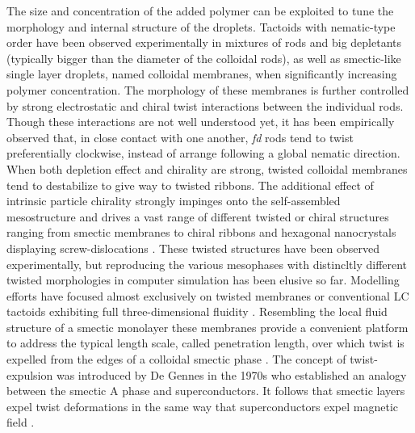  The size and concentration of the added polymer can be exploited to  tune the morphology and internal structure of the droplets. Tactoids with nematic-type order have been observed experimentally in mixtures of rods and big depletants (typically bigger than the diameter of the colloidal rods), as well as smectic-like single layer droplets, named colloidal membranes, when significantly increasing polymer concentration. The morphology of these membranes is further controlled by strong electrostatic and chiral twist interactions between the individual rods. Though these interactions are not well understood yet, it has been empirically observed that, in close contact with one another, {\em fd} rods tend to twist preferentially clockwise, instead of arrange following a global nematic direction. When both depletion effect and chirality are strong, twisted colloidal membranes tend to destabilize to give way to twisted ribbons. The additional effect of intrinsic particle chirality strongly impinges  onto the self-assembled mesostructure and drives a vast range of different twisted or chiral structures ranging from smectic membranes to chiral ribbons  \cite{Gibaud2012} and hexagonal nanocrystals displaying screw-dislocations \cite{grelet1}. These twisted structures have been observed experimentally, but reproducing the various mesophases with distincltly different twisted morphologies in computer simulation has been elusive so far.  Modelling efforts have focused almost exclusively on twisted membranes \cite{kang_sm2016,wensink2018elastic,kuhnhold2022colloidal} or conventional LC tactoids exhibiting full three-dimensional fluidity \cite{prinsen2003shape,prinsen2004parity,kuhnhold2022structure}. Resembling the local fluid structure of a smectic monolayer these membranes  provide a convenient platform  to address the typical length scale, called penetration length, over which twist is expelled from the edges of a colloidal smectic phase \cite{barry2009direct}. The concept of twist-expulsion was introduced by De Gennes in the 1970s who established an analogy between the smectic A phase and superconductors. It follows that smectic layers expel twist deformations in the same way that superconductors expel magnetic field \cite{gennes-prost}.



